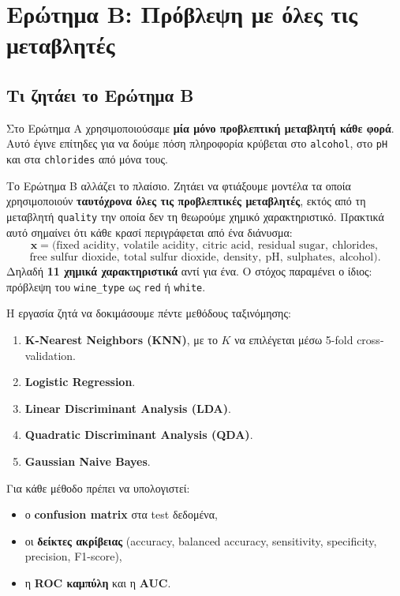 \documentclass[11pt,a4paper]{article}
\newcommand{\code}[1]{\texttt{#1}}
\begin{document}
\newpage

\section{Ερώτημα Β: Πρόβλεψη με όλες τις μεταβλητές}

\subsection{Τι ζητάει το Ερώτημα Β}

Στο Ερώτημα Α χρησιμοποιούσαμε \textbf{μία μόνο προβλεπτική μεταβλητή κάθε
φορά}. Αυτό έγινε επίτηδες για να δούμε πόση πληροφορία κρύβεται στο
\code{alcohol}, στο \code{pH} και στα \code{chlorides} από μόνα τους.

Το Ερώτημα Β αλλάζει το πλαίσιο. Ζητάει να φτιάξουμε μοντέλα τα οποία
χρησιμοποιούν \textbf{ταυτόχρονα όλες τις προβλεπτικές μεταβλητές}, εκτός
από τη μεταβλητή \code{quality} την οποία δεν τη θεωρούμε χημικό
χαρακτηριστικό. Πρακτικά αυτό σημαίνει ότι κάθε κρασί περιγράφεται από ένα
διάνυσμα:
\[
\mathbf{x} =
(\text{fixed acidity},\ \text{volatile acidity},\ \text{citric acid},\
\text{residual sugar},\ \text{chlorides},
\]
\[
\text{free sulfur dioxide},\ \text{total sulfur dioxide},\
\text{density},\ \text{pH},\ \text{sulphates},\ \text{alcohol}).
\]
Δηλαδή \textbf{11 χημικά χαρακτηριστικά} αντί για ένα. Ο στόχος παραμένει ο
ίδιος: πρόβλεψη του \code{wine\_type} ως \code{red} ή \code{white}.

Η εργασία ζητά να δοκιμάσουμε πέντε μεθόδους ταξινόμησης:
\begin{enumerate}
    \item \textbf{K-Nearest Neighbors (KNN)}, με το \(K\) να επιλέγεται μέσω
    5-fold cross-validation.
    \item \textbf{Logistic Regression}.
    \item \textbf{Linear Discriminant Analysis (LDA)}.
    \item \textbf{Quadratic Discriminant Analysis (QDA)}.
    \item \textbf{Gaussian Naive Bayes}.
\end{enumerate}

Για κάθε μέθοδο πρέπει να υπολογιστεί:
\begin{itemize}
    \item ο \textbf{confusion matrix} στα test δεδομένα,
    \item οι \textbf{δείκτες ακρίβειας} (accuracy, balanced accuracy,
    sensitivity, specificity, precision, F1-score),
    \item η \textbf{ROC καμπύλη} και η \textbf{AUC}.
\end{itemize}
\end{document}
